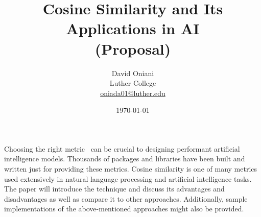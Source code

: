 \documentclass[11pt]{article}
\author{David Oniani\\
        Luther College\\
        \href{mailto:oniada01@luther.edu}{oniada01@luther.edu}}
\title{\textbf{}}
\title{\textbf{Cosine Similarity and Its Applications in AI\\(Proposal)}}
\date{\today}
\begin{document}
\maketitle


Choosing the right metric~\cite{thomas_uminsky} can be crucial to designing
performant artificial intelligence models. Thousands of packages and libraries
have been built and written just for providing these metrics. Cosine similarity
is one of many metrics used extensively in natural language processing and
artificial intelligence tasks.  The paper will introduce the technique and
discuss its advantages and disadvantages as well as compare it to other
approaches. Additionally, sample implementations of the above-mentioned
approaches might also be provided.


\printbibliography[heading=bibintoc]

\end{document}
